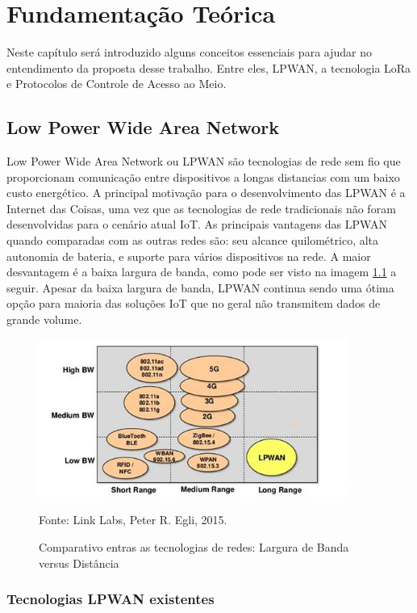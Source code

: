 \chapter{Fundamentação Teórica}

Neste capítulo será introduzido alguns conceitos essenciais para ajudar no entendimento
da proposta desse trabalho. Entre eles, LPWAN, a tecnologia LoRa e Protocolos de Controle
de Acesso ao Meio.

\section{Low Power Wide Area Network}

Low Power Wide Area Network ou LPWAN são tecnologias de rede sem fio que proporcionam comunicação
entre dispositivos a longas distancias com um baixo custo energético. A principal motivação para
o desenvolvimento das LPWAN é a Internet das Coisas, uma vez que as tecnologias de rede tradicionais
não foram desenvolvidas para o cenário atual IoT. As principais vantagens das LPWAN quando comparadas
com as outras redes são: seu alcance quilométrico, alta autonomia de bateria, e suporte para vários
dispositivos na rede. A maior desvantagem é a baixa largura de banda, como pode ser visto na imagem
\ref{fig:lpwan} a seguir. Apesar da baixa largura de banda, LPWAN continua sendo uma ótima opção
para maioria das soluções IoT que no geral não transmitem dados de grande volume. \cite{9243410}

\begin{figure}[H]
    \centering
	\caption{Comparativo entras as tecnologias de redes: Largura de Banda versus Distância}
    \includegraphics[width=0.9\textwidth]{img/lpwan.jpg}
    \label{fig:lpwan}
    
    Fonte: Link Labs, Peter R. Egli, 2015.
\end{figure}

\subsection{Tecnologias LPWAN existentes}

